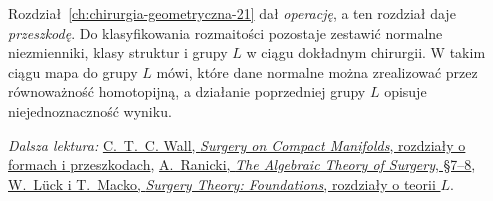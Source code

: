 Rozdział~\ref{ch:chirurgia-geometryczna-21}
dał \emph{operację}, a ten rozdział daje
\emph{przeszkodę}. Do klasyfikowania
rozmaitości pozostaje zestawić normalne
niezmienniki, klasy struktur i grupy $L$
w ciągu dokładnym chirurgii. W takim ciągu
mapa do grupy $L$ mówi, które dane normalne
można zrealizować przez równoważność
homotopijną, a działanie poprzedniej grupy
$L$ opisuje niejednoznaczność wyniku.

\par\smallskip
{\footnotesize\noindent\emph{Dalsza lektura:}
\href{https://webhomes.maths.ed.ac.uk/~v1ranick/books/scm.pdf}
{C.~T.~C. Wall, \emph{Surgery on Compact Manifolds},
rozdziały o formach i przeszkodach},
\href{https://webhomes.maths.ed.ac.uk/~v1ranick/papers/ats.pdf}
{A.\ Ranicki, \emph{The Algebraic Theory of Surgery},
§7--8},
\href{https://link.springer.com/book/10.1007/978-3-031-56334-8}
{W.\ Lück i T.\ Macko, \emph{Surgery Theory:
Foundations}, rozdziały o teorii $L$}.\par}

\clearpage
